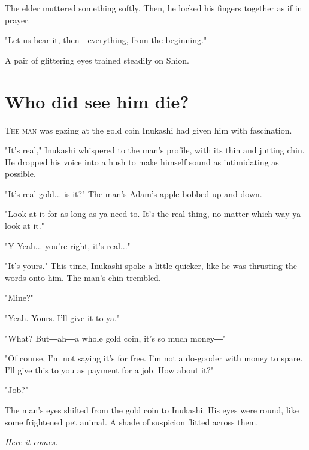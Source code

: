 The elder muttered something softly. Then, he locked his fingers
together as if in prayer.

"Let us hear it, then―everything, from the beginning."

A pair of glittering eyes trained steadily on Shion.

\chapter{Who did see him die?}


\lettrine{T}{he man} was gazing at the gold coin Inukashi had given him with
fascination.

"It's real," Inukashi whispered to the man's profile, with its thin and
jutting chin. He dropped his voice into a hush to make himself sound as
intimidating as possible.

"It's real gold... is it?" The man's Adam's apple bobbed up and down.

"Look at it for as long as ya need to. It's the real thing, no matter
which way ya look at it."

"Y-Yeah... you're right, it's real..."

"It's yours." This time, Inukashi spoke a little quicker, like he was
thrusting the words onto him. The man's chin trembled.

"Mine?"

"Yeah. Yours. I'll give it to ya."

"What? But―ah―a whole gold coin, it's so much money―"

"Of course, I'm not saying it's for free. I'm not a do-gooder with money
to spare. I'll give this to you as payment for a job. How about it?"

"Job?"

The man's eyes shifted from the gold coin to Inukashi. His eyes were
round, like some frightened pet animal. A shade of suspicion flitted
across them.

\emph{Here it comes.}

